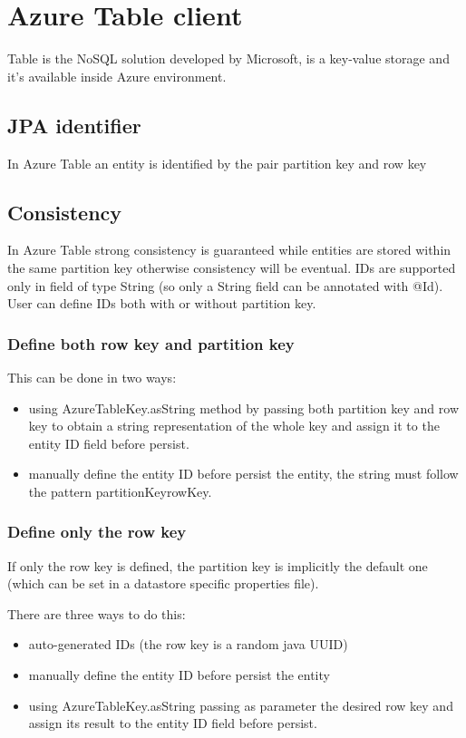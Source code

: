 \section{Azure Table client}
\label{sec:kundera-table}
Table is the NoSQL solution developed by Microsoft, is a key-value storage and it's available inside Azure environment.

\subsection{JPA identifier}
In Azure Table an entity is identified by the pair partition key and row key 

\subsection{Consistency}
In Azure Table strong consistency is guaranteed while entities are stored within the same partition key otherwise consistency will be eventual. IDs are supported only in field of type String (so only a String field can be annotated with @Id). User can define IDs both with or without partition key.

\subsubsection{Define both row key and partition key}
This can be done in two ways:
\begin{itemize}
\item using AzureTableKey.asString method by passing both partition key and row key to obtain a string representation of the whole key and assign it to the entity ID field before persist.
\item manually define the entity ID before persist the entity, the string must follow the pattern partitionKey\textunderscore rowKey.
\end{itemize}

\subsubsection{Define only the row key}
If only the row key is defined, the partition key is implicitly the default one (which can be set in a datastore specific properties file).

There are three ways to do this:
\begin{itemize}
\item auto-generated IDs (the row key is a random java UUID)
\item manually define the entity ID before persist the entity
\item using AzureTableKey.asString passing as parameter the desired row key and assign its result to the entity ID field before persist.
\end{itemize}

